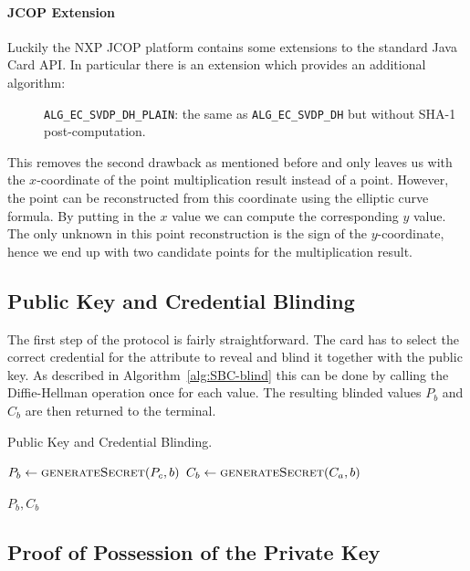 \paragraph{JCOP Extension}

Luckily the NXP JCOP platform contains some extensions to the standard Java Card
API. In particular there is an extension which provides an additional algorithm:
\begin{description}
  \item[] \texttt{ALG\_EC\_SVDP\_DH\_PLAIN}: the same as
    \texttt{ALG\_EC\_SVDP\_DH} but without SHA-1 post-computation.
\end{description}
This removes the second drawback as mentioned before and only leaves us with the
$x$-coordinate of the point multiplication result instead of a point. However,
the point can be reconstructed from this coordinate using the elliptic curve
formula. By putting in the $x$ value we can compute the corresponding $y$ value.
The only unknown in this point reconstruction is the sign of the $y$-coordinate,
hence we end up with two candidate points for the multiplication result.

\subsection{Public Key and Credential Blinding}

The first step of the protocol is fairly straightforward. The card has to
select the correct credential for the attribute to reveal and blind it together
with the public key. As described in Algorithm~\ref{alg:SBC-blind} this can be
done by calling the Diffie-Hellman operation once for each value. The resulting
blinded values $P_b$ and $C_b$ are then returned to the terminal.

\begin{algorithm}
  \caption{Public Key and Credential Blinding.}
  \label{alg:SBC-blind}
  \addtolength{\baselineskip}{1mm}
  \begin{algorithmic}[1]
      \State $P_b \gets \Call{generateSecret}{P_c, b}$
      \State $C_b \gets \Call{generateSecret}{C_a, b}$

      \Return $P_b, C_b$
    \EndFunction
  \end{algorithmic}
\end{algorithm}

\subsection{Proof of Possession of the Private Key}

